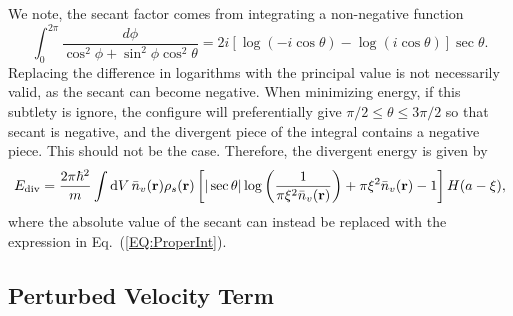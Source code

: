 \documentclass[onecolumn,nofootinbib,superscriptaddress]{revtex4}
\newcommand{\dd}[1]{\mathrm{d}#1\,}
\begin{document}
We note, the secant factor comes from integrating a non-negative function
\begin{equation}
\int^{2\pi}_0\frac{d\phi}{\cos^2\phi + \sin^2\phi\cos^2\theta} = 2i\left[\log\left(-i\cos\theta\right)-\log\left(i\cos\theta\right)\right]\sec\theta. \label{EQ:ProperInt}
\end{equation}
Replacing the difference in logarithms with the principal value is not necessarily valid, as the secant can become negative.  When minimizing energy, if this subtlety is ignore, the configure will preferentially give $\pi/2 \leq \theta \leq 3\pi/2$ so that secant is negative, and the divergent piece of the integral contains a negative piece.  This should not be the case.  Therefore, the divergent energy is given by
\begin{equation}
E_\text{div} = \frac{2\pi \hbar^2}{m}\int \dd{V} \bar{n}_v({\bf r}) \rho_s({\bf r})\left[|\sec\theta|\log\left(\frac{1}{\pi\xi^2 \bar{n}_v({\bf r})}\right) + \pi\xi^2\bar{n}_v({\bf r}) - 1\right] H(a - \xi), \label{EQ:EnergyDiv}
\end{equation}
where the absolute value of the secant can instead be replaced with the expression in Eq.~(\ref{EQ:ProperInt}).



\subsection{Perturbed Velocity Term}
\end{document}
